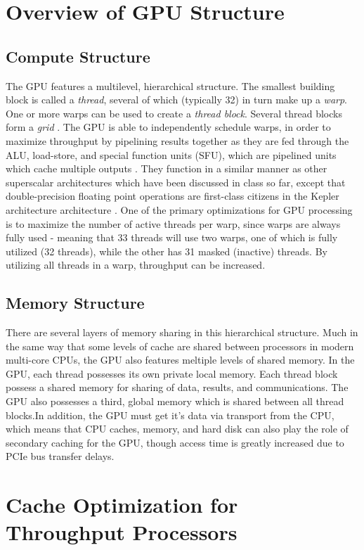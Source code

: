 \documentclass[conference]{IEEEtran}
\begin{document}
\section{Overview of GPU Structure}
\subsection{Compute Structure}
The GPU features a multilevel, hierarchical structure. 
The smallest building block is called a \emph{thread}, several of which 
(typically 32) in turn make up a \emph{warp}. One or more warps can be used to
create a \emph{thread block}. Several thread blocks form a \emph{grid} 
\cite{cuda}. The GPU is able to independently schedule warps, in order
to maximize throughput by pipelining results together as they are fed
through the ALU, load-store, and special function units (SFU), which are
pipelined units which cache multiple outputs \cite{whitepaper}. 
They function in a similar manner as other superscalar architectures 
which have been discussed in class so far, except that double-precision
floating point operations are first-class citizens in the Kepler architecture
architecture \cite{notes}. One of the primary optimizations for GPU processing
is to maximize the number of active threads per warp, since warps are always
fully used - meaning that 33 threads will use two warps, one of which is 
fully utilized (32 threads), while the other has 31 masked (inactive) threads.
By utilizing all threads in a warp, throughput can be increased.

\subsection{Memory Structure}
There are several layers of memory sharing in this hierarchical structure. Much
in the same way that some levels of cache are shared between processors in
modern multi-core CPUs, the GPU also features meltiple levels of shared 
memory. In the GPU, each thread possesses its own private 
local memory. Each thread block possess a shared memory for sharing of data, 
results, and communications. The GPU also possesses a third, global memory 
which is shared between all thread blocks.In addition, the GPU must get it's 
data via transport from the CPU, which means that CPU caches, memory, and hard
disk can also play the role of secondary caching for the GPU, though access
time is greatly increased due to PCIe bus transfer delays.

\section{Cache Optimization for Throughput Processors}
\end{document}
